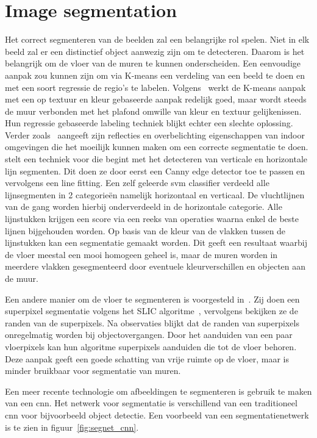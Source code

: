     \section{Image segmentation}
        Het correct segmenteren van de beelden zal een belangrijke rol spelen. Niet in elk beeld zal er een distinctief object aanwezig zijn om te detecteren. Daarom is het belangrijk om de vloer van
        de muren te kunnen onderscheiden. Een eenvoudige aanpak zou kunnen zijn om via K-means een verdeling van een beeld te doen en met een soort regressie de regio's te labelen. 
        Volgens~\cite{zhangwall} werkt de K-means aanpak met een op textuur en kleur gebaseerde aanpak redelijk goed, maar wordt steeds de muur verbonden met het plafond omwille van kleur en textuur gelijkenissen.
        Hun regressie gebaseerde labeling techniek blijkt echter een slechte oplossing. Verder zoals~\cite{Li2010} aangeeft zijn reflecties en overbelichting eigenschappen van indoor omgevingen die het moeilijk kunnen maken om
        een correcte segmentatie te doen.
        \cite{Li2010} stelt een techniek voor die begint met het detecteren van verticale en horizontale lijn segmenten. Dit doen ze door eerst een Canny edge detector\cite{Canny} toe te passen en vervolgens een line fitting.
        Een zelf geleerde \gls{svm} classifier verdeeld alle lijnsegmenten in 2 categorie\"{e}n namelijk horizontaal en verticaal. De vluchtlijnen van de gang worden hierbij onderverdeeld in de horizontale categorie.
        Alle lijnstukken krijgen een score via een reeks van operaties waarna enkel de beste lijnen bijgehouden worden. Op basis van de kleur van de vlakken tussen de lijnstukken kan een segmentatie gemaakt worden.
        Dit geeft een resultaat waarbij de vloer meestal een mooi homogeen geheel is, maar de muren worden in meerdere vlakken gesegmenteerd door eventuele kleurverschillen en objecten aan de muur.
        
        Een andere manier om de vloer te segmenteren is voorgesteld in~\cite{Rodriguez-Telles2013}. Zij doen een superpixel segmentatie volgens het SLIC algoritme~\cite{slic}, vervolgens bekijken ze de randen van de superpixels.
        Na observaties blijkt dat de randen van superpixels onregelmatig worden bij objectovergangen. Door het aanduiden van een paar vloerpixels kan hun algoritme superpixels aanduiden die tot de vloer behoren.
        Deze aanpak geeft een goede schatting van vrije ruimte op de vloer, maar is minder bruikbaar voor segmentatie van muren.

        Een meer recente technologie om afbeeldingen te segmenteren is gebruik te maken van een \gls{cnn}. Het netwerk voor segmentatie is verschillend van een traditioneel \gls{cnn} voor bijvoorbeeld object detectie.
        Een voorbeeld van een segmentatienetwerk is te zien in figuur~\ref{fig:segnet_cnn}.

